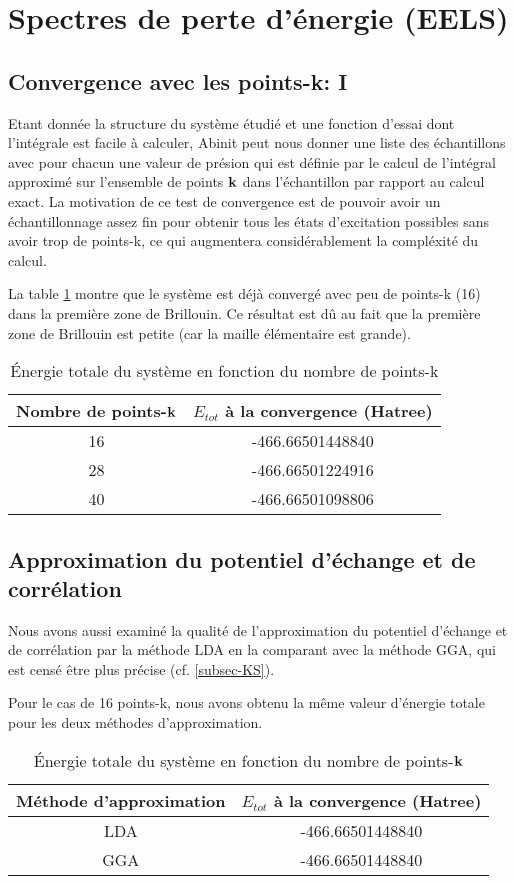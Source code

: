 \section{Spectres de perte d'énergie (EELS)}
\subsection{Convergence avec les points-k: I}
Etant donnée la structure du système étudié et une fonction d'essai dont l'intégrale est facile à calculer,
Abinit peut nous donner une liste des échantillons avec pour chacun une valeur de présion
qui est définie par le calcul de l'intégral approximé sur l'ensemble de points $\vb{k}$ dans l'échantillon
par rapport au calcul exact.
La motivation de ce test de convergence est de pouvoir avoir un échantillonnage
assez fin pour obtenir tous les états d'excitation possibles sans avoir trop de points-k,
ce qui augmentera considérablement la compléxité du calcul.

La table \cref{tab-etotPK} montre que le système est déjà convergé avec peu de points-k (16) dans la première zone de Brillouin.
Ce résultat est dû au fait que la première zone de Brillouin est petite (car la maille élémentaire est grande).
\begin{table}[ht]\label{tab-etotPK}
\caption{Énergie totale du système en fonction du nombre de points-k}
\centering
\begin{tabular}{c c}
\toprule
Nombre de points-$\vb{k}$  &  $E_{tot}$ à la convergence (Hatree)
\\
\midrule
16    &  -466.66501448840
\\
28    &  -466.66501224916
\\
40    &  -466.66501098806
\bottomrule
\end{tabular}
\end{table}

\subsection{Approximation du potentiel d'échange et de corrélation}
Nous avons aussi examiné la qualité de l'approximation du potentiel d'échange et de corrélation
par la méthode LDA en la comparant avec la méthode GGA,
qui est censé être plus précise (cf. \cref{subsec-KS}).

Pour le cas de 16 points-k, nous avons obtenu la même valeur d'énergie totale pour les deux méthodes d'approximation.

\begin{table}[ht]\label{etotPK}
\caption{Énergie totale du système en fonction du nombre de points-$\vb{k}$}
\centering
\begin{tabular}{c c}
\toprule
Méthode d'approximation &  $E_{tot}$ à la convergence (Hatree)
\\
\midrule
LDA    &  -466.66501448840
\\
GGA   &   -466.66501448840
\bottomrule
\end{tabular}
\end{table}

